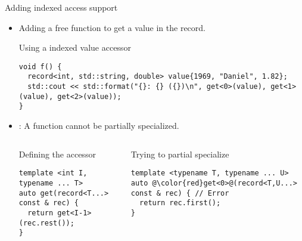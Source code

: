\begin{frame}[t,fragile]{Adding indexed access support}
\begin{itemize}
  \item Adding a free function to get a value in the record.

\begin{block}{Using a indexed value accessor}
\begin{lstlisting}
void f() {
  record<int, std::string, double> value{1969, "Daniel", 1.82};
  std::cout << std::format("{}: {} ({})\n", get<0>(value), get<1>(value), get<2>(value));
}
\end{lstlisting}
\end{block}

  \item {}: A function cannot be partially specialized.


\begin{columns}[T]

\begin{block}{Defining the accessor}
\begin{lstlisting}
template <int I, typename ... T>
auto get(record<T...> const & rec) {
  return get<I-1>(rec.rest());
}
\end{lstlisting}
\end{block}

\pause
{}
\begin{block}{Trying to partial specialize}
\begin{lstlisting}[escapechar=@]
template <typename T, typename ... U>
auto @\color{red}get<0>@(record<T,U...> const & rec) { // Error
  return rec.first();
}
\end{lstlisting}
\end{block}

\end{columns}
\end{itemize}
\end{frame}

